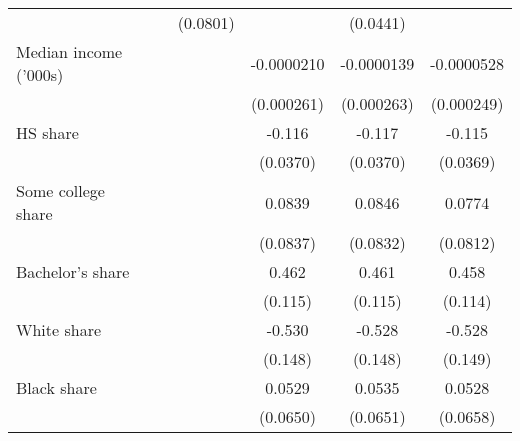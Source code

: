 {\begin{tabular}{l*{6}{c}}
                    &                     &                     &    (0.0801)         &                     &    (0.0441)         &                     \\
\addlinespace
Median income ('000s)&                     &                     &                     &  -0.0000210         &  -0.0000139         &  -0.0000528         \\
                    &                     &                     &                     &  (0.000261)         &  (0.000263)         &  (0.000249)         \\
\addlinespace
HS share            &                     &                     &                     &      -0.116\sym{***}&      -0.117\sym{***}&      -0.115\sym{***}\\
                    &                     &                     &                     &    (0.0370)         &    (0.0370)         &    (0.0369)         \\
\addlinespace
Some college share  &                     &                     &                     &      0.0839         &      0.0846         &      0.0774         \\
                    &                     &                     &                     &    (0.0837)         &    (0.0832)         &    (0.0812)         \\
\addlinespace
Bachelor's share    &                     &                     &                     &       0.462\sym{***}&       0.461\sym{***}&       0.458\sym{***}\\
                    &                     &                     &                     &     (0.115)         &     (0.115)         &     (0.114)         \\
\addlinespace
White share         &                     &                     &                     &      -0.530\sym{***}&      -0.528\sym{***}&      -0.528\sym{***}\\
                    &                     &                     &                     &     (0.148)         &     (0.148)         &     (0.149)         \\
\addlinespace
Black share         &                     &                     &                     &      0.0529         &      0.0535         &      0.0528         \\
                    &                     &                     &                     &    (0.0650)         &    (0.0651)         &    (0.0658)         \\

\end{tabular}}
